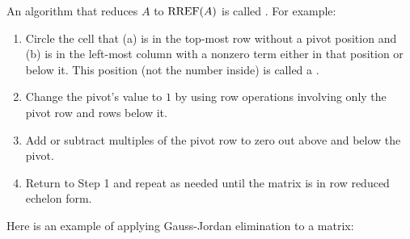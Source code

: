 
\begin{applicationActivities}{3}{5}

\begin{definition}
  An algorithm that reduces \(A\) to \(\operatorname{RREF}(A)\) is called
  . For example:
  \begin{enumerate}
    \item Circle the cell that
      (a) is in the top-most row without a pivot position and
      (b) is in the left-most column with a nonzero term either in that
          position or below it.
      This position (not the number inside) is called a .
  	\item Change the pivot's value to \(1\) by using row operations involving
      only the pivot row and rows below it.
  	\item Add or subtract multiples of the pivot row to zero out above and below the pivot.
    \item Return to Step 1 and repeat as needed until the matrix is
    in row reduced echelon form.
  \end{enumerate}
\end{definition}

\begin{observation}
  Here is an example of applying Gauss-Jordan elimination to a matrix:


\end{observation}
\end{applicationActivities}
